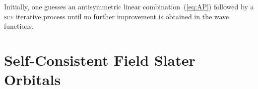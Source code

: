 
Initially, one guesses an antisymmetric linear
combination~(\ref{eq:AP}) followed by a \textsc{scf} iterative process
until no further improvement is obtained in the wave functions.


\section{Self-Consistent Field Slater Orbitals}
\label{ch:scf_sto}




